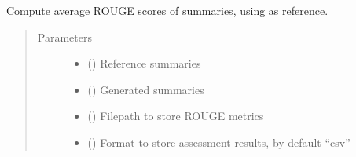 \documentclass[letterpaper,10pt,english]{sphinxmanual}
\begin{document}
\begin{fulllineitems}
\label{\detokenize{code:utils.compute_rouge_score}}
\sphinxAtStartPar
Compute average ROUGE scores of  summaries, using  as reference.
\begin{quote}\begin{description}
\item[{Parameters}] \leavevmode\begin{itemize}
\item {} 
\sphinxAtStartPar
{} () \textendash{} Reference summaries

\item {} 
\sphinxAtStartPar
{} () \textendash{} Generated summaries

\item {} 
\sphinxAtStartPar
{} (\sphinxstyleliteralemphasis{\sphinxupquote{{[}}}\sphinxstyleliteralemphasis{\sphinxupquote{, }}\sphinxstyleliteralemphasis{\sphinxupquote{{]}}}) \textendash{} Filepath to store ROUGE metrics

\item {} 
\sphinxAtStartPar
{} (\sphinxstyleliteralemphasis{\sphinxupquote{, }}) \textendash{} Format to store assessment results, by default “csv”

\end{itemize}

\end{description}\end{quote}

\end{fulllineitems}
\end{document}
